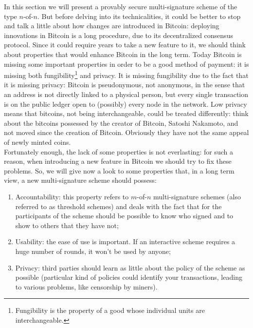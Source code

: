 \bigskip
\noindent
In this section we will present a provably secure multi-signature scheme of the type $n$-of-$n$. But before delving into its technicalities, it could be better to stop and talk a little about how changes are introduced in Bitcoin: deploying innovations in Bitcoin is a long procedure, due to its decentralized consensus protocol. Since it could require years to take a new feature to it, we should think about properties that would enhance Bitcoin in the long term. Today Bitcoin is missing some important properties in order to be a good method of payment: it is missing both fungibility\footnote{Fungibility is the property of a good whose individual units are interchangeable.} and privacy. It is missing fungibility due to the fact that it is missing privacy: Bitcoin is pseudonymous, not anonymous, in the sense that an address is not directly linked to a physical person, but every single transaction is on the public  ledger open to (possibly) every node in the network. Low privacy means that bitcoins, not being interchangeable, could be treated differently: think about the bitcoins possessed by the creator of Bitcoin, Satoshi Nakamoto, and not moved since the creation of Bitcoin. Obviously they have not the same appeal of newly minted coins.
\\
Fortunately enough, the lack of some properties is not everlasting: for such a reason, when introducing a new feature in Bitcoin we should try to fix these problems. So, we will give now a look to some properties that, in a long term view, a new multi-signature scheme should possess:
\begin{enumerate}
	\item Accountability: this property refers to $m$-of-$n$ multi-signature schemes (also referred to as threshold schemes) and deals with the fact that for the participants of the scheme should be possible to know who signed and to show to others that they have not;
	\item Usability: the ease of use is important. If an interactive scheme requires a huge number of rounds, it won't be used by anyone;
	\item Privacy: third parties should learn as little about the policy of the scheme as possible (particular kind of policies could identify your transactions, leading to various problems, like censorship by miners).
\end{enumerate}

